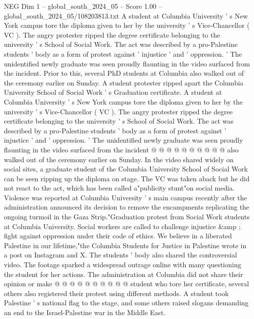 \begin{textsample}{NEG Dim 1 – global\_south\_2024\_05 – Score 1.00 – global\_south\_2024\_05/108203813.txt}  \label{ex:f1_neg_375}
A student at Columbia University ' s New York campus tore the diploma given to her by the university ' s Vice-Chancellor ( VC ).
The angry protester ripped the degree certificate belonging to the university ' s School of Social Work.
The act was described by a pro-Palestine students ' body as a form of protest against ' injustice ' and ' oppression. ' The unidentified newly graduate was seen proudly flaunting in the video surfaced from the incident.
Prior to this, several PhD students at Columbia also walked out of the ceremony earlier on Sunday.
A student protester ripped apart the Columbia University School of Social Work ' s Graduation certificate.
A student at Columbia University ' s New York campus tore the diploma given to her by the university ' s Vice-Chancellor ( VC ).
The angry protester ripped the degree certificate belonging to the university ' s School of Social Work.
The act was described by a pro-Palestine students ' body as a form of protest against ' injustice ' and ' oppression. ' The unidentified newly graduate was seen proudly flaunting in the video surfaced from the incident @ @ @ @ @ @ @ @ @ @ also walked out of the ceremony earlier on Sunday.
In the video shared widely on social sites, a graduate student of the Columbia University School of Social Work can be seen ripping up the diploma on stage.
The VC was taken aback but he did not react to the act, which has been called a"publicity stunt"on social media.
Violence was reported at Columbia University ' s main campus recently after the administration announced its decision to remove the encampments replicating the ongoing turmoil in the Gaza Strip."Graduation protest from Social Work students at Columbia University.
Social workers are called to challenge injustice \&amp ; fight against oppression under their code of ethics.
We believe in a liberated Palestine in our lifetime,"the Columbia Students for Justice in Palestine wrote in a post on Instagram and X.
The students ' body also shared the controversial video.
The footage sparked a widespread outrage online with many questioning the student for her actions.
The administration at Columbia did not share their opinion or make @ @ @ @ @ @ @ @ @ @ student who tore her certificate, several others also registered their protest using different methods.
A student took Palestine ' s national flag to the stage, and some others raised slogans demanding an end to the Israel-Palestine war in the Middle East.

\end{textsample}
